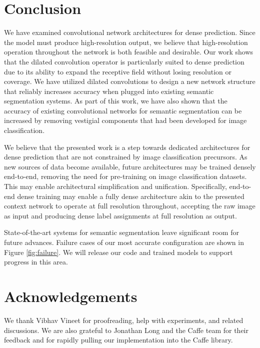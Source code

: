 \documentclass{article} %
\begin{document}
\section{Conclusion}

We have examined convolutional network architectures for dense prediction. Since the model must produce high-resolution output, we believe that high-resolution operation throughout the network is both feasible and desirable. Our work shows that the dilated convolution operator is particularly suited to dense prediction due to its ability to expand the receptive field without losing resolution or coverage. We have utilized dilated convolutions to design a new network structure that reliably increases accuracy when plugged into existing semantic segmentation systems. As part of this work, we have also shown that the accuracy of existing convolutional networks for semantic segmentation can be increased by removing vestigial components that had been developed for image classification.

We believe that the presented work is a step towards dedicated architectures for dense prediction that are not constrained by image classification precursors. As new sources of data become available, future architectures may be trained densely end-to-end, removing the need for pre-training on image classification datasets. This may enable architectural simplification and unification. Specifically, end-to-end dense training may enable a fully dense architecture akin to the presented context network to operate at full resolution throughout, accepting the raw image as input and producing dense label assignments at full resolution as output.

State-of-the-art systems for semantic segmentation leave significant room for future advances.
Failure cases of our most accurate configuration are shown in Figure \ref{fig:failure}. We will release our code and trained models to support progress in this area.


\section*{Acknowledgements}

We thank Vibhav Vineet for proofreading, help with experiments, and related discussions. We are also grateful to Jonathan Long and the Caffe team for their feedback and for rapidly pulling our implementation into the Caffe library.
\end{document}
